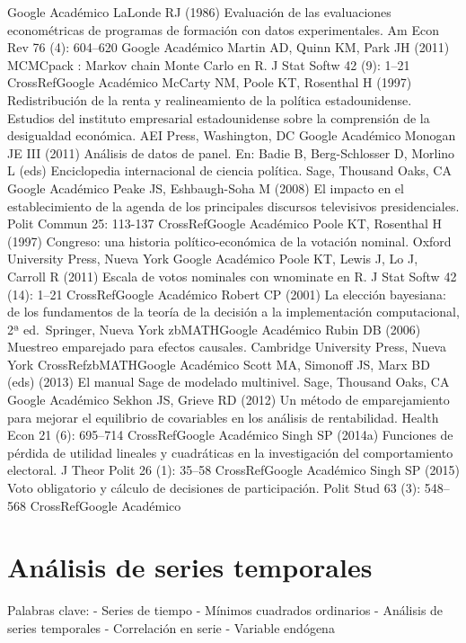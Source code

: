 \documentclass[
]{book}
\begin{document}
Google Académico
LaLonde RJ (1986) Evaluación de las evaluaciones econométricas de programas de formación con datos experimentales. Am Econ Rev 76 (4): 604--620
Google Académico
Martin AD, Quinn KM, Park JH (2011) MCMCpack : Markov chain Monte Carlo en R. J Stat Softw 42 (9): 1--21
CrossRefGoogle Académico
McCarty NM, Poole KT, Rosenthal H (1997) Redistribución de la renta y realineamiento de la política estadounidense. Estudios del instituto empresarial estadounidense sobre la comprensión de la desigualdad económica. AEI Press, Washington, DC
Google Académico
Monogan JE III (2011) Análisis de datos de panel. En: Badie B, Berg-Schlosser D, Morlino L (eds) Enciclopedia internacional de ciencia política. Sage, Thousand Oaks, CA
Google Académico
Peake JS, Eshbaugh-Soha M (2008) El impacto en el establecimiento de la agenda de los principales discursos televisivos presidenciales. Polit Commun 25: 113-137
CrossRefGoogle Académico
Poole KT, Rosenthal H (1997) Congreso: una historia político-económica de la votación nominal. Oxford University Press, Nueva York
Google Académico
Poole KT, Lewis J, Lo J, Carroll R (2011) Escala de votos nominales con wnominate en R. J Stat Softw 42 (14): 1--21
CrossRefGoogle Académico
Robert CP (2001) La elección bayesiana: de los fundamentos de la teoría de la decisión a la implementación computacional, 2ª ed.~Springer, Nueva York
zbMATHGoogle Académico
Rubin DB (2006) Muestreo emparejado para efectos causales. Cambridge University Press, Nueva York
CrossRefzbMATHGoogle Académico
Scott MA, Simonoff JS, Marx BD (eds) (2013) El manual Sage de modelado multinivel. Sage, Thousand Oaks, CA
Google Académico
Sekhon JS, Grieve RD (2012) Un método de emparejamiento para mejorar el equilibrio de covariables en los análisis de rentabilidad. Health Econ 21 (6): 695--714
CrossRefGoogle Académico
Singh SP (2014a) Funciones de pérdida de utilidad lineales y cuadráticas en la investigación del comportamiento electoral. J Theor Polit 26 (1): 35--58
CrossRefGoogle Académico
Singh SP (2015) Voto obligatorio y cálculo de decisiones de participación. Polit Stud 63 (3): 548--568
CrossRefGoogle Académico

\hypertarget{Anuxe1lisisdeseriestemporales}{%
\chapter{Análisis de series temporales}\label{Anuxe1lisisdeseriestemporales}}

Palabras clave:
- Series de tiempo
- Mínimos cuadrados ordinarios
- Análisis de series temporales
- Correlación en serie
- Variable endógena
\end{document}
